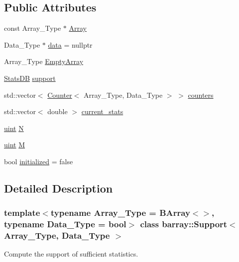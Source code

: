 \subsection*{Public Attributes}
\begin{DoxyCompactItemize}
\item 
const Array\+\_\+\+Type $\ast$ \hyperlink{classbarray_1_1_support_aa0ec8266add20838b0de4f79c12cc1dc}{Array}
\item 
Data\+\_\+\+Type $\ast$ \hyperlink{classbarray_1_1_support_a5154e40ba3276e0378b78d06ff63cd8e}{data} = nullptr
\item 
Array\+\_\+\+Type \hyperlink{classbarray_1_1_support_a7e3007df178a2b6dd4bbe02e355bc174}{Empty\+Array}
\item 
\hyperlink{classbarray_1_1_stats_d_b}{Stats\+DB} \hyperlink{classbarray_1_1_support_a5c509beff6f44ff560179180ceaf6fd3}{support}
\item 
std\+::vector$<$ \hyperlink{classbarray_1_1_counter}{Counter}$<$ Array\+\_\+\+Type, Data\+\_\+\+Type $>$ $>$ \hyperlink{classbarray_1_1_support_a18c811739ff907dbc66e3f2c5152d495}{counters}
\item 
std\+::vector$<$ double $>$ \hyperlink{classbarray_1_1_support_acb71d75c4f498aff69fe28323d3b6f66}{current\+\_\+stats}
\item 
\hyperlink{namespacebarray_af9756a31953db233f80a9cfe1ef31c32}{uint} \hyperlink{classbarray_1_1_support_aecfa544ce5307fa5bf05b938c957a79e}{N}
\item 
\hyperlink{namespacebarray_af9756a31953db233f80a9cfe1ef31c32}{uint} \hyperlink{classbarray_1_1_support_a8adc9270abedbe8a49c6e25f0b14640d}{M}
\item 
bool \hyperlink{classbarray_1_1_support_ad54a705b49123c3cbf4b7eb546c0bcf5}{initialized} = false
\end{DoxyCompactItemize}


\subsection{Detailed Description}
\subsubsection*{template$<$typename Array\+\_\+\+Type = B\+Array$<$$>$, typename Data\+\_\+\+Type = bool$>$\newline
class barray\+::\+Support$<$ Array\+\_\+\+Type, Data\+\_\+\+Type $>$}

Compute the support of sufficient statistics. 

